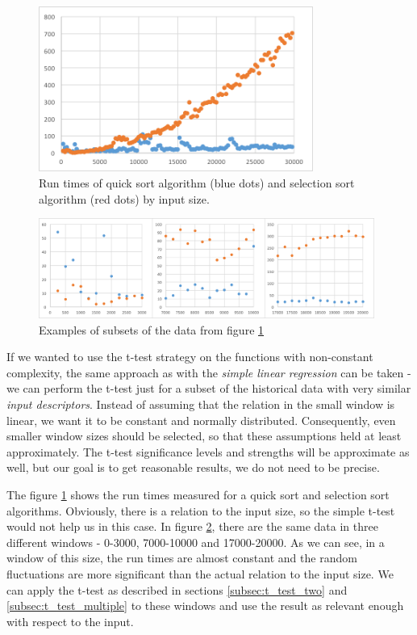 \begin{figure}[h!]
	\captionsetup{justification=centering,margin=0.5cm}
	\centerline{\mbox{\includegraphics[width=90mm]{./img/quick_vs_selection.png}}}
	\caption{Run times of quick sort algorithm (blue dots) and selection sort algorithm (red dots) by input size.}
	\label{fig:quick_vs_selection}
\end{figure}

\begin{figure}[h!]
	\captionsetup{justification=centering,margin=0.5cm}
	\centerline{\mbox{\includegraphics[width=110mm]{./img/window_t_test_examples.png}}}
	\caption{Examples of subsets of the data from figure \ref{fig:quick_vs_selection}}
	\label{fig:window_t_test_examples}
\end{figure}

If we wanted to use the t-test strategy on the functions with non-constant complexity, the same approach as with the \textit{simple linear regression} can be taken - we can perform the t-test just for a subset of the historical data with very similar \textit{input descriptors}. Instead of assuming that the relation in the small window is linear, we want it to be constant and normally distributed. Consequently, even smaller window sizes should be selected, so that these assumptions held at least approximately. The t-test significance levels and strengths will be approximate as well, but our goal is to get reasonable results, we do not need to be precise.

The figure \ref{fig:quick_vs_selection} shows the run times measured for a quick sort and selection sort algorithms. Obviously, there is a relation to the input size, so the simple t-test would not help us in this case. In figure \ref{fig:window_t_test_examples}, there are the same data in three different windows - 0-3000, 7000-10000 and 17000-20000. As we can see, in a window of this size, the run times are almost constant and the random fluctuations are more significant than the actual relation to the input size. We can apply the t-test as described in sections \ref{subsec:t_test_two} and \ref{subsec:t_test_multiple} to these windows and use the result as relevant enough with respect to the input.

